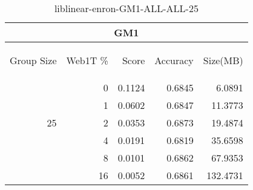 \begin{center}
\begin{table}[htbp] 
 \begin{center}
\begin{tabular}{ | r | r | r | r | r |}
\hline
\multicolumn{5}{|c|}{GM1}\\
\hline
\begin{sideways}Group Size\end{sideways} & \begin{sideways}Web1T \%\end{sideways} & \begin{sideways}Score\end{sideways} & \begin{sideways}Accuracy\end{sideways} & \begin{sideways}Size(MB)\end{sideways}\\
\hline
\multirow{5}{*}{25}
 & 0 & 0.1124 & 0.6845 & 6.0891\\ \cline{2-5}
 & 1 & 0.0602 & 0.6847 & 11.3773\\ \cline{2-5}
 & 2 & 0.0353 & 0.6873 & 19.4874\\ \cline{2-5}
 & 4 & 0.0191 & 0.6819 & 35.6598\\ \cline{2-5}
 & 8 & 0.0101 & 0.6862 & 67.9353\\ \cline{2-5}
 & 16 & 0.0052 & 0.6861 & 132.4731\\ \cline{2-5}
\hline
\end{tabular}
\caption{liblinear-enron-GM1-ALL-ALL-25}
\label{table:liblinear-enron-GM1-ALL-ALL-25}
\end{center}
 \end{table}
\end{center}

